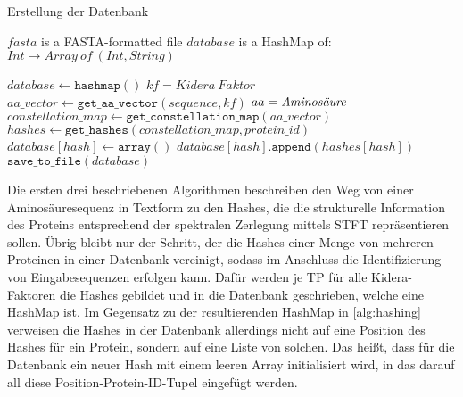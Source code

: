         \begin{algorithm}[H]
            \caption{Erstellung der Datenbank}\label{alg:datenbank}
            \begin{algorithmic}[1]
                \Require $fasta$ is a FASTA-formatted file
                \Ensure $database$ is a HashMap of: $Int \rightarrow Array\ of\ (Int, String)$

                \State $database \gets \texttt{hashmap}()$
                     \Comment $kf=Kidera\ Faktor$
                        \State $aa\_vector \gets \texttt{get\_aa\_vector}(sequence, kf)$ \Comment $aa = \emph{Aminosäure}$
                        \State $constellation\_map \gets \texttt{get\_constellation\_map}(aa\_vector)$
                        \State $hashes \gets \texttt{get\_hashes}(constellation\_map, protein\_id)$
                                \State $database[hash] \gets \texttt{array}()$
                            \EndIf
                            \State $database[hash].\texttt{append}(hashes[hash])$
                        \EndFor
                    \EndFor
                \EndFor
                \State $\texttt{save\_to\_file}(database)$
            \end{algorithmic}
        \end{algorithm}

        Die ersten drei beschriebenen Algorithmen beschreiben den Weg von einer Aminosäuresequenz in Textform zu den Hashes, die die strukturelle Information des Proteins entsprechend der spektralen Zerlegung mittels \ac{STFT} repräsentieren sollen. Übrig bleibt nur der Schritt, der die Hashes einer Menge von mehreren Proteinen in einer Datenbank vereinigt, sodass im Anschluss die Identifizierung von Eingabesequenzen erfolgen kann. Dafür werden je \ac{TP} für alle Kidera-Faktoren die Hashes gebildet und in die Datenbank geschrieben, welche eine HashMap ist. Im Gegensatz zu der resultierenden HashMap in \autoref{alg:hashing} verweisen die Hashes in der Datenbank allerdings nicht auf eine Position des Hashes für ein Protein, sondern auf eine Liste von solchen. Das heißt, dass für die Datenbank ein neuer Hash mit einem leeren Array initialisiert wird, in das darauf all diese Position-Protein-ID-Tupel eingefügt werden.

